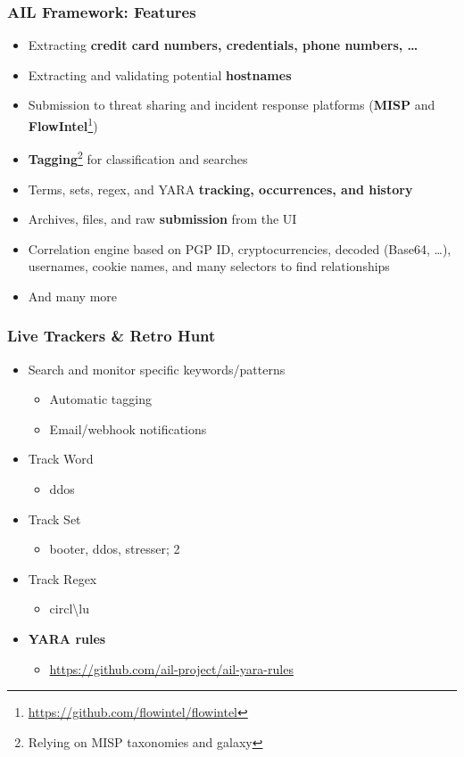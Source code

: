\documentclass[10pt,aspectratio=169, colorlinks=true, linkcolor=circlBlue]{beamer}
\begin{document}
\begin{frame}
    \frametitle{AIL Framework: Features}
    \begin{itemize}
        \item Extracting \textbf{credit card numbers, credentials, phone numbers, \dots}
        \item Extracting and validating potential \textbf{hostnames}
        \item Submission to threat sharing and incident response platforms (\textbf{MISP} and \textbf{FlowIntel}\footnote{\url{https://github.com/flowintel/flowintel}})
        \item \textbf{Tagging}\footnote{Relying on MISP taxonomies and galaxy} for classification and searches
        \item Terms, sets, regex, and YARA \textbf{tracking, occurrences, and history}
        \item Archives, files, and raw \textbf{submission} from the UI
        \item Correlation engine based on PGP ID, cryptocurrencies, decoded (Base64, \dots), usernames, cookie names, and many selectors to find relationships
        \item And many more
    \end{itemize}
\end{frame}


\begin{frame}
	\frametitle{Live Trackers \& Retro Hunt}
    \begin{itemize}
        \item Search and monitor specific keywords/patterns
        \begin{itemize}
            \item Automatic tagging
            \item Email/webhook notifications
        \end{itemize}
        \item Track Word
        \begin{itemize}
            \item ddos
        \end{itemize}
        \item Track Set
        \begin{itemize}
            \item booter, ddos, stresser; 2
        \end{itemize}
        \item Track Regex
        \begin{itemize}
            \item circl\textbackslash lu
        \end{itemize}
        \item {\bf YARA rules}
        \begin{itemize}
            \item \url{https://github.com/ail-project/ail-yara-rules}
        \end{itemize}
    \end{itemize}
\end{frame}
\end{document}

